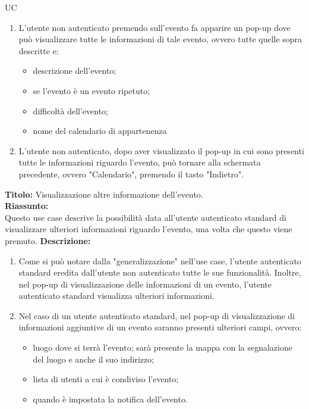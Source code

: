 \begin{listaPersonale}{UC}
\begin{listaPersonale2} [UC] {}
\begin{enumerate}
\begin{itemize}
                  \end{itemize}
                  \begin{comment} "può comprendere a quale calendario o raggruppamento appartiene l'evento" \end{comment}
            \item L'utente non autenticato premendo sull'evento fa apparire un pop-up dove può visualizzare tutte le informazioni di tale evento, ovvero tutte quelle sopra descritte e:
                  \begin{itemize}
                      \item descrizione dell'evento;
                      \item se l'evento è un evento ripetuto;
                      \item difficoltà dell'evento;
                      \item nome del calendario di appartenenza
                  \end{itemize}
            \item L'utente non autenticato, dopo aver visualizzato il pop-up in cui sono presenti tutte le informazioni riguardo l'evento, può tornare alla schermata precedente, ovvero "Calendario", premendo il tasto "Indietro".
        \end{enumerate}
        \textbf{Titolo: } Visualizzazione altre informazione dell'evento. \\
        \textbf{Riassunto: } \\ Questo use case descrive la possibilità data all'utente autenticato standard di visualizzare ulteriori informazioni riguardo l'evento, una volta che questo viene premuto.
        \textbf{Descrizione: }
        \begin{enumerate}
            \item Come si può notare dalla "generalizzazione" nell'use case, l'utente autenticato standard eredita dall'utente non autenticato tutte le sue funzionalità. Inoltre, nel pop-up di visualizzazione delle informazioni di un evento, l'utente autenticato standard visualizza ulteriori informazioni.
            \item Nel caso di un utente autenticato standard, nel pop-up di visualizzazione di informazioni aggiuntive di un evento saranno presenti ulteriori campi, ovvero:
                  \begin{itemize}
                      \item luogo dove si terrà l'evento; sarà presente la mappa con la segnalazione del luogo e anche il suo indirizzo;
                      \item lista di utenti a cui è condiviso l'evento;
                      \item quando è impostata la notifica dell'evento.
                  \end{itemize}
        \end{enumerate}


\end{listaPersonale2}
\end{listaPersonale}
